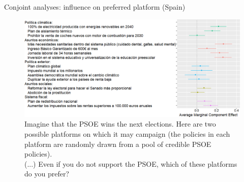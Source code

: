 \documentclass[aspectratio=169,xcolor=dvipsnames, 11pt,mathserif]{beamer}
\begin{document}
\begin{frame}{Conjoint analyses: influence on preferred platform (Spain) \hyperlink{conjoint_r_uk}{}\label{conjoint_r_es}} 
    \bbvs \ip {}
    \ee
    \begin{figure}\vspace{-.4cm}
        \centering 
        \caption{Imagine that the PSOE wins the next elections. Here are two possible platforms on which it may campaign (the policies in each platform are randomly drawn from a pool of credible PSOE policies).\\
		(...) Even if you do not support the PSOE, which of these platforms do you prefer? }
        \vspace{-.2cm} 
        \includegraphics[height=.7\textheight]{../figures/ES/ca_r.png} 
    \end{figure}
\end{frame}
\end{document}
